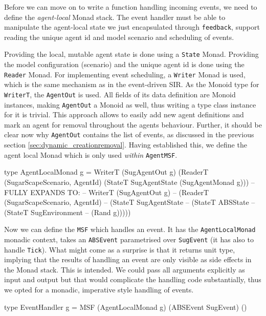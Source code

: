 Before we can move on to write a function handling incoming events, we need to define the \textit{agent-local} Monad stack. The event handler must be able to manipulate the agent-local state we just encapsulated through \texttt{feedback}, support reading the unique agent id and model scenario and scheduling of events.

Providing the local, mutable agent state is done using a \texttt{State} Monad. Providing the model configuration (scenario) and the unique agent id is done using the \texttt{Reader} Monad. For implementing event scheduling, a \texttt{Writer} Monad is used, which is the same mechanism as in the event-driven SIR. As the Monoid type for \texttt{WriterT}, the \texttt{AgentOut} is used. All fields of its data definition are Monoid instances, making \texttt{AgentOut} a Monoid as well, thus writing a type class instance for it is trivial. This approach allows to easily add new agent definitions and mark an agent for removal throughout the agents behaviour. Further, it should be clear now why \texttt{AgentOut} contains the list of events, as discussed in the previous section \ref{sec:dynamic_creationremoval}. Having established this, we define the agent local Monad which is only used \textit{within} \texttt{AgentMSF}.

\begin{HaskellCode}
type AgentLocalMonad g = WriterT (SugAgentOut g) 
                           (ReaderT (SugarScapeScenario, AgentId) 
                             (StateT SugAgentState (SugAgentMonad g)))     
-- FULLY EXPANDS TO:
-- WriterT (SugAgentOut g) 
--  (ReaderT (SugarScapeScenario, AgentId) 
--    (StateT SugAgentState 
--      (StateT ABSState 
--        (StateT SugEnvironment 
--          (Rand g)))))
\end{HaskellCode}

Now we can define the \texttt{MSF} which handles an event. It has the \texttt{AgentLocalMonad} monadic context, takes an \texttt{ABSEvent} parametrised over \texttt{SugEvent} (it has also to handle \texttt{Tick}). What might come as a surprise is that it returns unit type, implying that the results of handling an event are only visible as side effects in the Monad stack. This is intended. We could pass all arguments explicitly as input and output but that would complicate the handling code substantially, thus we opted for a monadic, imperative style handling of events.

\begin{HaskellCode}
type EventHandler g = MSF (AgentLocalMonad g) (ABSEvent SugEvent) ()
\end{HaskellCode}

